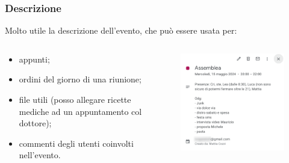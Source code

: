 \documentclass[]{beamer}
\begin{document}
\begin{frame}
\frametitle{Descrizione}
Molto utile la descrizione dell'evento, che può essere usata per:
\begin{columns}
  \begin{column}{.5\textwidth}
\begin{itemize}
  \item appunti;
  \item ordini del giorno di una riunione;
  \item file utili (posso allegare ricette mediche ad un appuntamento col dottore);
  \item commenti degli utenti coinvolti nell'evento.
\end{itemize}
  \end{column}
  \begin{column}{.4\textwidth}
    \begin{figure}
      \includegraphics[width=\columnwidth]{img/calendarnotes.png}
    \end{figure}
  \end{column}
\end{columns}

\end{frame}
\end{document}
